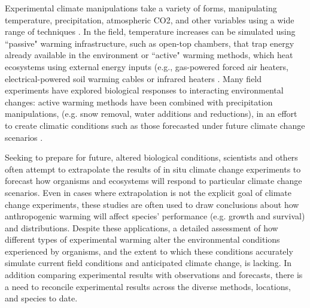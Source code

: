 \documentclass{article}
\begin{document}
\par Experimental climate manipulations take a variety of forms, manipulating temperature, precipitation, atmospheric CO2, and other variables using a wide range of techniques \citep{shaver2000,aronson2009}. In the field, temperature increases can be simulated using ``passive" warming infrastructure, such as open-top chambers, that trap energy already available in the environment or ``active" warming methods, which heat ecosystems using external energy inputs (e.g., gas-powered forced air heaters, electrical-powered soil warming cables or infrared heaters \citep{shaver2000}. Many field experiments have explored biological responses to interacting environmental changes: active warming methods have been combined with precipitation manipulations, (e.g. snow removal,  water additions and reductions), in  an  effort to create  climatic  conditions such  as  those  forecasted  under  future climate  change scenarios \citep{price1998,cleland2006,sherry2007,rollinson2012}.
\par Seeking to prepare  for future, altered  biological conditions, scientists and others  often attempt to extrapolate the results of in situ climate change experiments to forecast how organisms and ecosystems will respond to particular climate change scenarios.  Even in cases where extrapolation is not the explicit goal of climate change experiments, these studies are often used to draw conclusions  about how anthropogenic warming  will affect species' performance  (e.g. growth and  survival)  and  distributions\citep{dukes1999,hobbie1999,reich2015,gruner2016}.  Despite these applications, a detailed  assessment of how different types of experimental warming alter the environmental conditions experienced by organisms, and the extent to which these conditions accurately simulate current field conditions and anticipated climate change, is lacking.  In addition comparing experimental results with observations and forecasts, there is a need to reconcile experimental results across the diverse methods, locations, and species to date. 
\end{document}
